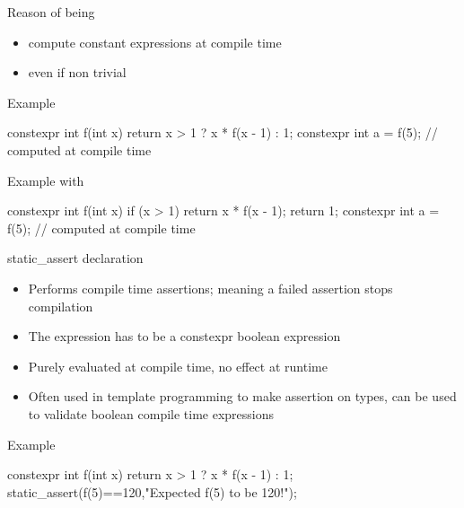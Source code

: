 \begin{frame}[fragile]
  \begin{block}{Reason of being}
    \begin{itemize}
    \item compute constant expressions at compile time
    \item even if non trivial
    \end{itemize}
  \end{block}
  \pause
  \begin{exampleblock}{Example}
    \begin{cppcode*}{}
      constexpr int f(int x) {
        return x > 1 ? x * f(x - 1) : 1;
      }
      constexpr int a = f(5); // computed at compile time
    \end{cppcode*}
  \end{exampleblock}
  \pause
  \begin{exampleblock}{Example with }
    \begin{cppcode*}{}
      constexpr int f(int x) {
        if (x > 1) return x * f(x - 1);
        return 1;
      }
      constexpr int a = f(5); // computed at compile time
    \end{cppcode*}
  \end{exampleblock}
\end{frame}

\begin{frame}[fragile]
  \begin{block}{static\_assert declaration}
    \begin{itemize}
    \item Performs compile time assertions; meaning a failed assertion stops compilation
    \item The expression has to be a constexpr boolean expression
    \item Purely evaluated at compile time, no effect at runtime
    \item Often used in template programming to make assertion on types, can be
      used to validate boolean compile time expressions
    \end{itemize}
  \end{block}
  \pause
  \begin{exampleblock}{Example}
    \begin{cppcode*}{}
      constexpr int f(int x) {
        return x > 1 ? x * f(x - 1) : 1;
      }
      static_assert(f(5)==120,"Expected f(5) to be 120!");
    \end{cppcode*}
  \end{exampleblock}
\end{frame}


